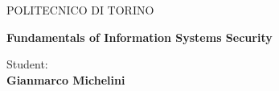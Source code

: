 \begin{titlepage}
\begin{figure}[!htb]
    \centering
\end{figure}
\vspace{30mm}
\begin{center}
    \LARGE{POLITECNICO DI TORINO}
    \vspace{5mm}
\end{center}

\vspace{15mm}
\begin{center}        
    {\LARGE{\bf Fundamentals of Information Systems Security}}
\end{center}
\vspace{30mm}

\hfill
\begin{center}

\large{Student:}
{\normalsize\vspace{3mm} \bf\\ \large{Gianmarco Michelini}}
\end{center}


\vspace{30mm}
\hrulefill
\\

\end{titlepage}